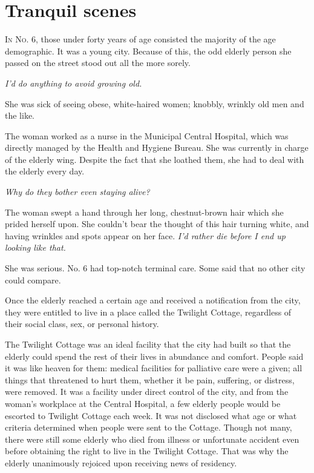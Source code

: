 
\chapter{Tranquil scenes}


\lettrine{I}{n No. 6}, those under forty years of age consisted the majority of the
age demographic. It was a young city. Because of this, the odd elderly
person she passed on the street stood out all the more sorely.

\emph{I'd do anything to avoid growing old.}

She was sick of seeing obese, white-haired women; knobbly, wrinkly old
men and the like.

The woman worked as a nurse in the Municipal Central Hospital, which was
directly managed by the Health and Hygiene Bureau. She was currently in
charge of the elderly wing. Despite the fact that she loathed them, she
had to deal with the elderly every day.

\emph{Why do they bother even staying alive?}

The woman swept a hand through her long, chestnut-brown hair which she
prided herself upon. She couldn't bear the thought of this hair turning
white, and having wrinkles and spots appear on her face. \emph{I'd rather die
before I end up looking like that.}

She was serious. No. 6 had top-notch terminal care. Some said that no
other city could compare.

Once the elderly reached a certain age and received a notification from
the city, they were entitled to live in a place called the Twilight
Cottage, regardless of their social class, sex, or personal history.

The Twilight Cottage was an ideal facility that the city had built so
that the elderly could spend the rest of their lives in abundance and
comfort. People said it was like heaven for them: medical facilities for
palliative care were a given; all things that threatened to hurt them,
whether it be pain, suffering, or distress, were removed. It was a
facility under direct control of the city, and from the woman's
workplace at the Central Hospital, a few elderly people would be
escorted to Twilight Cottage each week. It was not disclosed what age or
what criteria determined when people were sent to the Cottage. Though
not many, there were still some elderly who died from illness or
unfortunate accident even before obtaining the right to live in the
Twilight Cottage. That was why the elderly unanimously rejoiced upon
receiving news of residency.

